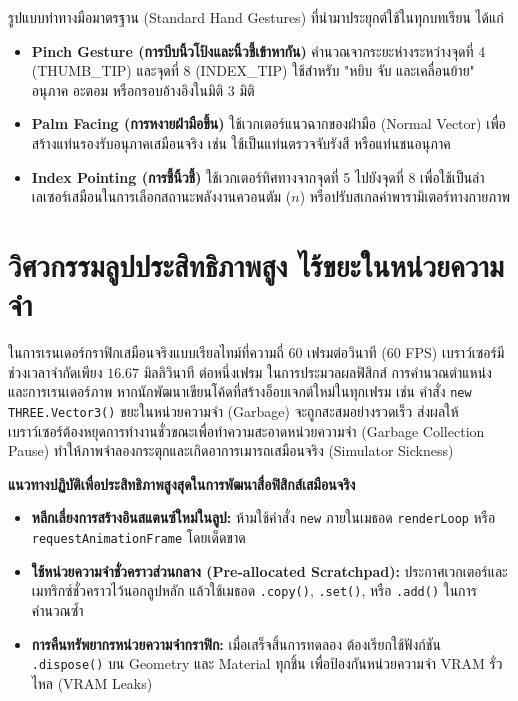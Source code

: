 รูปแบบท่าทางมือมาตรฐาน (Standard Hand Gestures) ที่นำมาประยุกต์ใช้ในทุกบทเรียน ได้แก่
\begin{itemize}
    \item \textbf{Pinch Gesture (การบีบนิ้วโป้งและนิ้วชี้เข้าหากัน)} คำนวณจากระยะห่างระหว่างจุดที่ 4 (THUMB\_TIP) และจุดที่ 8 (INDEX\_TIP) ใช้สำหรับ "หยิบ จับ และเคลื่อนย้าย" อนุภาค อะตอม หรือกรอบอ้างอิงในมิติ 3 มิติ
    \item \textbf{Palm Facing (การหงายฝ่ามือขึ้น)} ใช้เวกเตอร์แนวฉากของฝ่ามือ (Normal Vector) เพื่อสร้างแท่นรองรับอนุภาคเสมือนจริง เช่น ใช้เป็นแท่นตรวจจับรังสี หรือแท่นชนอนุภาค
    \item \textbf{Index Pointing (การชี้นิ้วชี้)} ใช้เวกเตอร์ทิศทางจากจุดที่ 5 ไปยังจุดที่ 8 เพื่อใช้เป็นลำเลเซอร์เสมือนในการเลือกสถานะพลังงานควอนตัม ($n$) หรือปรับสเกลค่าพารามิเตอร์ทางกายภาพ
\end{itemize}

\section*{วิศวกรรมลูปประสิทธิภาพสูง ไร้ขยะในหน่วยความจำ}

ในการเรนเดอร์กราฟิกเสมือนจริงแบบเรียลไทม์ที่ความถี่ 60 เฟรมต่อวินาที (60 FPS) เบราว์เซอร์มีช่วงเวลาจำกัดเพียง $16.67\text{ มิลลิวินาที}$ ต่อหนึ่งเฟรม ในการประมวลผลฟิสิกส์ การคำนวณตำแหน่ง และการเรนเดอร์ภาพ หากนักพัฒนาเขียนโค้ดที่สร้างอ็อบเจกต์ใหม่ในทุกเฟรม เช่น คำสั่ง \texttt{new THREE.Vector3()} ขยะในหน่วยความจำ (Garbage) จะถูกสะสมอย่างรวดเร็ว ส่งผลให้เบราว์เซอร์ต้องหยุดการทำงานชั่วขณะเพื่อทำความสะอาดหน่วยความจำ (Garbage Collection Pause) ทำให้ภาพจำลองกระตุกและเกิดอาการเมารถเสมือนจริง (Simulator Sickness)

\begin{pitfallbox}
\textbf{แนวทางปฏิบัติเพื่อประสิทธิภาพสูงสุดในการพัฒนาสื่อฟิสิกส์เสมือนจริง}
\begin{itemize}
    \item \textbf{หลีกเลี่ยงการสร้างอินสแตนซ์ใหม่ในลูป:} ห้ามใช้คำสั่ง \texttt{new} ภายในเมธอด \texttt{renderLoop} หรือ \texttt{requestAnimationFrame} โดยเด็ดขาด
    \item \textbf{ใช้หน่วยความจำชั่วคราวส่วนกลาง (Pre-allocated Scratchpad):} ประกาศเวกเตอร์และเมทริกซ์ชั่วคราวไว้นอกลูปหลัก แล้วใช้เมธอด \texttt{.copy()}, \texttt{.set()}, หรือ \texttt{.add()} ในการคำนวณซ้ำ
    \item \textbf{การคืนทรัพยากรหน่วยความจำกราฟิก:} เมื่อเสร็จสิ้นการทดลอง ต้องเรียกใช้ฟังก์ชัน \texttt{.dispose()} บน Geometry และ Material ทุกชิ้น เพื่อป้องกันหน่วยความจำ VRAM รั่วไหล (VRAM Leaks)
\end{itemize}
\end{pitfallbox}

